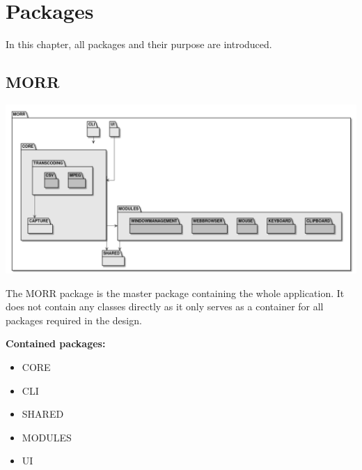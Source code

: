 \chapter{Packages}
\label{ch:package}
\newenvironment{packclass}[0]{\textbf{Contained classes:} \begin{itemize}
}{\end{itemize}}
\newenvironment{packenum}[0]{\textbf{Contained enums:} \begin{itemize}
}{\end{itemize}}
\newenvironment{packif}[0]{\textbf{Contained interfaces:} \begin{itemize}
}{\end{itemize}}
\newenvironment{packpack}[0]{\textbf{Contained packages:} \begin{itemize}
}{\end{itemize}}
\newcommand{\packobj}[1]{\item #1}
\newcommand{\abstract}[1]{\textit{abstract} #1}

In this chapter, all packages and their purpose are introduced.

\section{MORR}

\begin{center}
    \includegraphics[width=1.0\textwidth]{resources/Packages/AllPackages.png}
\end{center}

The MORR package is the master package containing the whole application. It does not contain any classes directly as it only serves as a container for all packages required in the design.

\begin{packpack}
\packobj{CORE}
\packobj{CLI}
\packobj{SHARED}
\packobj{MODULES}
\packobj{UI}
\end{packpack}

